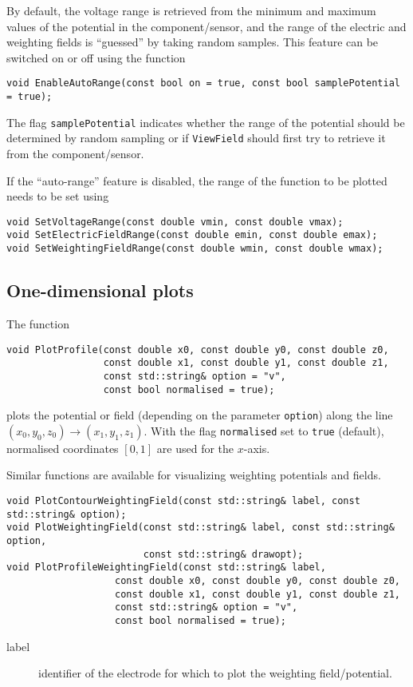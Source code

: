 By default, the voltage range is retrieved from the 
minimum and maximum values of the 
potential in the component/sensor, and
the range of the electric and weighting fields is
``guessed'' by taking random samples.
This feature can be switched on or off using the function
\begin{lstlisting}
void EnableAutoRange(const bool on = true, const bool samplePotential = true);
\end{lstlisting}
The flag \texttt{samplePotential} indicates whether the range of the 
potential should be determined by random sampling or if \texttt{ViewField}
should first try to retrieve it from the component/sensor. 

If the ``auto-range'' feature is disabled,
the range of the function to be plotted needs to be set using
\begin{lstlisting}
void SetVoltageRange(const double vmin, const double vmax);
void SetElectricFieldRange(const double emin, const double emax);
void SetWeightingFieldRange(const double wmin, const double wmax);
\end{lstlisting}

\subsection{One-dimensional plots}
The function 
\begin{lstlisting}
void PlotProfile(const double x0, const double y0, const double z0,
                 const double x1, const double y1, const double z1,
                 const std::string& option = "v",
                 const bool normalised = true);
\end{lstlisting}
plots the potential or field (depending on the parameter \texttt{option}) 
along the line  
\(\left(x_{0}, y_{0}, z_{0}\right) \rightarrow 
  \left(x_{1}, y_{1}, z_{1}\right)\).
With the flag \texttt{normalised} set to \texttt{true} (default), 
normalised coordinates $\left[0, 1\right]$ are used for the $x$-axis. 

Similar functions are available for visualizing weighting potentials and fields.
\begin{lstlisting}
void PlotContourWeightingField(const std::string& label, const std::string& option);
void PlotWeightingField(const std::string& label, const std::string& option,
                        const std::string& drawopt);
void PlotProfileWeightingField(const std::string& label,
                   const double x0, const double y0, const double z0,
                   const double x1, const double y1, const double z1,
                   const std::string& option = "v",
                   const bool normalised = true);
\end{lstlisting}
\begin{description}
  \item[label] identifier of the electrode for which to plot the weighting field/potential.
\end{description}

